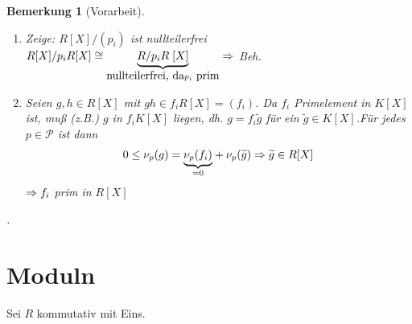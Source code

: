 \documentclass[a4paper,10pt,german]{scrbook}
\theoremstyle{saetze}
\theoremstyle{definitionen}
\newtheorem{Bem}[Def]{Bemerkung}
\begin{document}
\begin{Bem}[Vorarbeit]
{\begin{enumerate}
\item[(i)] Zeige: $R[X]/(p_i)$ ist nullteilerfrei
\newline$R[X]/p_i R[X] \cong
\underset{\mbox{nullteilerfrei, da} p_i \mbox{ prim}}{\underbrace{
R/p_i R\;[X]}} \Rightarrow$ Beh.
\item[(i)] Seien $g,h \in R[X]$ mit $gh \in f_i R[X] = (f_i)$. Da
$f_i$ Primelement in $K[X]$ ist, muß (z.B.) $g$ in $f_i K[X]$
liegen, dh. $g = f_i \widetilde{g}$ für ein $\widetilde{g} \in
K[X]$.\newline Für jedes $p \in \mathcal{P}$ ist dann \[0 \leq
\nu_p(g) = \underset{=0}{\underbrace{\nu_p(f_i)}} +
\nu_p(\widetilde{g}) \Rightarrow \widetilde{g} \in R[X]\] $\Rightarrow f_i$ prim in
$R[X]$ \end{enumerate}.}
\end{Bem}

\section{Moduln}

Sei $R$ kommutativ mit Eins.
\end{document}
